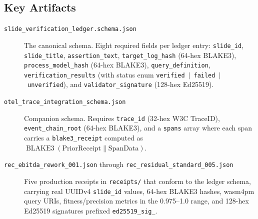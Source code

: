 \subsection{Key Artifacts}
\label{sec:schemas-identity-artifacts}

\begin{description}
  \item[\texttt{slide\_verification\_ledger.schema.json}] The canonical schema. Eight required
    fields per ledger entry: \texttt{slide\_id}, \texttt{slide\_title}, \texttt{assertion\_text},
    \texttt{target\_log\_hash} (64-hex BLAKE3), \texttt{process\_model\_hash} (64-hex BLAKE3),
    \texttt{query\_definition}, \texttt{verification\_results} (with status enum
    \texttt{verified}~$|$~\texttt{failed}~$|$~\texttt{unverified}), and \texttt{validator\_signature}
    (128-hex Ed25519).
  \item[\texttt{otel\_trace\_integration\_schema.json}] Companion schema. Requires \texttt{trace\_id}
    (32-hex W3C TraceID), \texttt{event\_chain\_root} (64-hex BLAKE3), and a \texttt{spans} array
    where each span carries a \texttt{blake3\_receipt} computed as
    $\operatorname{BLAKE3}(\text{PriorReceipt} \| \text{SpanData})$.
  \item[\texttt{rec\_ebitda\_rework\_001.json} through \texttt{rec\_residual\_standard\_005.json}]
    Five production receipts in \texttt{receipts/} that conform to the ledger schema, carrying
    real UUIDv4 \texttt{slide\_id} values, 64-hex BLAKE3 hashes, wasm4pm query URIs,
    fitness/precision metrics in the 0.975--1.0 range, and 128-hex Ed25519 signatures prefixed
    \texttt{ed25519\_sig\_}.
\end{description}
